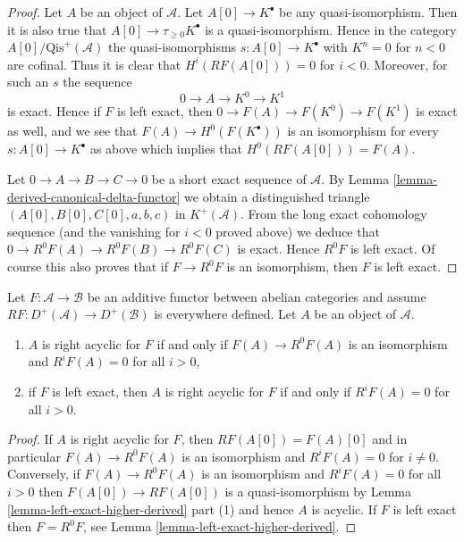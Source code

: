 \begin{proof}
Let $A$ be an object of $\mathcal{A}$. Let $A[0] \to K^\bullet$
be any quasi-isomorphism. Then it is also true that
$A[0] \to \tau_{\geq 0}K^\bullet$ is a quasi-isomorphism.
Hence in the category $A[0]/\text{Qis}^{+}(\mathcal{A})$ the
quasi-isomorphisms $s : A[0] \to K^\bullet$ with $K^n = 0$ for $n < 0$
are cofinal. Thus it is clear that $H^i(RF(A[0])) = 0$ for $i < 0$.
Moreover, for such an $s$ the sequence
$$
0 \to A \to K^0 \to K^1
$$
is exact. Hence if $F$ is left exact, then $0 \to F(A) \to F(K^0) \to F(K^1)$
is exact as well, and we see that $F(A) \to H^0(F(K^\bullet))$ is an
isomorphism for every $s : A[0] \to K^\bullet$ as above which implies
that $H^0(RF(A[0])) = F(A)$.

\medskip\noindent
Let $0 \to A \to B \to C \to 0$ be a short exact sequence of $\mathcal{A}$.
By
Lemma \ref{lemma-derived-canonical-delta-functor}
we obtain a distinguished triangle
$(A[0], B[0], C[0], a, b, c)$ in $K^{+}(\mathcal{A})$.
From the long exact cohomology sequence (and the vanishing for $i < 0$
proved above) we deduce that $0 \to R^0F(A) \to R^0F(B) \to R^0F(C)$
is exact. Hence $R^0F$ is left exact. Of course this also proves that if
$F \to R^0F$ is an isomorphism, then $F$ is left exact.
\end{proof}

\begin{lemma}
\label{lemma-F-acyclic}
Let $F : \mathcal{A} \to \mathcal{B}$ be an additive functor
between abelian categories and assume
$RF : D^{+}(\mathcal{A}) \to D^{+}(\mathcal{B})$ is everywhere
defined. Let $A$ be an object of $\mathcal{A}$.
\begin{enumerate}
\item $A$ is right acyclic for $F$ if and only if
$F(A) \to R^0F(A)$ is an isomorphism and $R^iF(A) = 0$ for all $i > 0$,
\item if $F$ is left exact, then $A$ is right acyclic for $F$
if and only if $R^iF(A) = 0$ for all $i > 0$.
\end{enumerate}
\end{lemma}

\begin{proof}
If $A$ is right acyclic for $F$, then $RF(A[0]) = F(A)[0]$ and in
particular $F(A) \to R^0F(A)$ is an isomorphism and
$R^iF(A) = 0$ for $i \not = 0$. Conversely, if $F(A) \to R^0F(A)$
is an isomorphism and $R^iF(A) = 0$ for all $i > 0$ then
$F(A[0]) \to RF(A[0])$ is a quasi-isomorphism by
Lemma \ref{lemma-left-exact-higher-derived} part (1)
and hence $A$ is acyclic. If $F$ is left exact then $F = R^0F$, see
Lemma \ref{lemma-left-exact-higher-derived}.
\end{proof}

